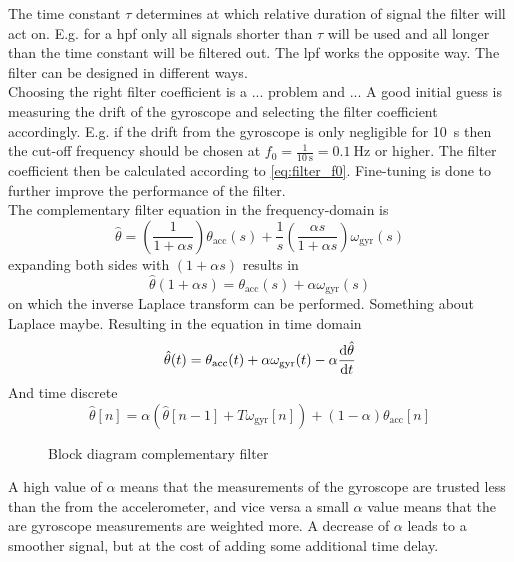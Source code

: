 The time constant $\tau$ determines at which relative duration of signal the filter will act on.
E.g. for a \gls{hpf} only all signals shorter than $\tau$ will be used and all longer than the time constant will be filtered out.
The \gls{lpf} works the opposite way.
The filter can be designed in different ways.\\
Choosing the right filter coefficient is a ... problem and ...
A good initial guess is measuring the drift of the gyroscope and selecting the filter coefficient accordingly.
E.g. if the drift from the gyroscope is only negligible for \SI{10}{\second} then the cut-off frequency should be chosen at $f_0 = \frac{1}{\SI{10}{\second}} = \SI{0.1}{\hertz}$ or higher.
The filter coefficient then be calculated according to \cref{eq:filter_f0}.
Fine-tuning is done to further improve the performance of the filter.\\
The complementary filter equation in the frequency-domain is
\begin{equation}
	\label{eq:compl_filt_f}
	\hat{\theta} = \left(\frac{1}{1 + \alpha s}\right)\theta_\mathrm{acc}(s) + \frac{1}{s}\left(\frac{\alpha s}{1 + \alpha s}\right) \omega_\mathrm{gyr}(s)
\end{equation}
expanding both sides with $(1 + \alpha s)$ results in
\begin{equation}
	\hat{\theta}(1 + \alpha s) = \theta_\mathrm{acc}(s) + \alpha\omega_\mathrm{gyr}(s)
\end{equation}
on which the inverse Laplace transform can be performed.
Something about Laplace maybe.
Resulting in the equation in time domain
\begin{equation}
	\hat{\theta}(t) = \theta_\mathrm{acc}(t) + \alpha\omega_\mathrm{gyr}(t) - \alpha \dv{\hat{\theta}}{t}
\end{equation}
And time discrete
\begin{equation}
	\hat{\theta}[n] = \alpha\left(\hat{\theta}[n - 1] + T \omega_\mathrm{gyr}[n]\right) + (1 - \alpha) \theta_\mathrm{acc}[n]
\end{equation}
\begin{figure}[htb]
	\centering
	
	\caption{Block diagram complementary filter}
	\label{fig:tikz_complementary_filter}
\end{figure}
A high value of $\alpha$ means that the measurements of the gyroscope are trusted less than the from the accelerometer, and vice versa a small $\alpha$ value means that the are gyroscope measurements are weighted more.
\cite{1997Baerveldt} \cite{2007Colton}
A decrease of $\alpha$ leads to a smoother signal, but at the cost of adding some additional time delay.


